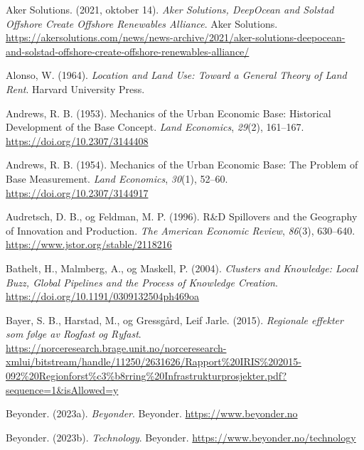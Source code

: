 \documentclass[
]{article}
\newlength{\cslhangindent}
\newlength{\cslentryspacingunit} %
\newenvironment{CSLReferences}[2] %
 {%
  \setlength{\parindent}{0pt}
  \ifodd #1
  \let\oldpar\par
  \def\par{\hangindent=\cslhangindent\oldpar}
  \fi
  \setlength{\parskip}{#2\cslentryspacingunit}
 }%
 {}
\begin{document}
\hypertarget{refs}{}
\begin{CSLReferences}{1}{0}
\leavevmode{}%
Aker Solutions. (2021, oktober 14). \emph{Aker {Solutions}, {DeepOcean}
and {Solstad Offshore Create Offshore Renewables Alliance}}. {Aker
Solutions}.
\url{https://akersolutions.com/news/news-archive/2021/aker-solutions-deepocean-and-solstad-offshore-create-offshore-renewables-alliance/}

\leavevmode{}%
Alonso, W. (1964). \emph{Location and {Land Use}: {Toward} a {General
Theory} of {Land Rent}}. {Harvard University Press}.

\leavevmode{}%
Andrews, R. B. (1953). Mechanics of the {Urban Economic Base}:
{Historical Development} of the {Base Concept}. \emph{Land Economics},
\emph{29}(2), 161--167. \url{https://doi.org/10.2307/3144408}

\leavevmode{}%
Andrews, R. B. (1954). Mechanics of the {Urban Economic Base}: {The
Problem} of {Base Measurement}. \emph{Land Economics}, \emph{30}(1),
52--60. \url{https://doi.org/10.2307/3144917}

\leavevmode{}%
Audretsch, D. B., og Feldman, M. P. (1996). R\&{D Spillovers} and the
{Geography} of {Innovation} and {Production}. \emph{The American
Economic Review}, \emph{86}(3), 630--640.
\url{https://www.jstor.org/stable/2118216}

\leavevmode{}%
Bathelt, H., Malmberg, A., og Maskell, P. (2004). \emph{Clusters and
Knowledge: Local Buzz, Global Pipelines and the Process of Knowledge
Creation}. \url{https://doi.org/10.1191/0309132504ph469oa}

\leavevmode{}%
Bayer, S. B., Harstad, M., og Gressgård, Leif Jarle. (2015).
\emph{Regionale effekter som følge av Rogfast og Ryfast}.
\url{https://norceresearch.brage.unit.no/norceresearch-xmlui/bitstream/handle/11250/2631626/Rapport\%20IRIS\%202015-092\%20Regionforst\%c3\%b8rring\%20Infrastrukturprosjekter.pdf?sequence=1\&isAllowed=y}

\leavevmode{}%
Beyonder. (2023a). \emph{Beyonder}. {Beyonder}.
\url{https://www.beyonder.no}

\leavevmode{}%
Beyonder. (2023b). \emph{Technology}. {Beyonder}.
\url{https://www.beyonder.no/technology}


\end{CSLReferences}
\end{document}
